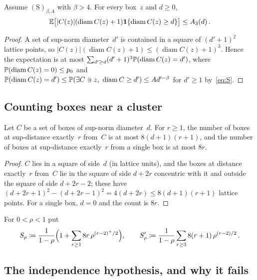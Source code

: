\documentclass[11pt,letterpaper]{article}
\DeclareMathOperator{\diam}{diam}
\begin{document}
\begin{lemma}
\label{lem:onecluster}
Assume $\mathrm{(S)}_{\beta,A}$ with $\beta>4$. For every box~$z$ and $d\ge0$,
\begin{equation*}
  \E\bigl[\lvert C(z)\rvert(\diam C(z)+1)\1\{\diam C(z)\ge d\}\bigr]\le A_3(d)\,.
\end{equation*}
\end{lemma}

\begin{proof}
A set of sup-norm diameter~$d'$ is contained in a square of $(d'+1)^2$ lattice points, so $\lvert C(z)\rvert(\diam C(z)+1)\le(\diam C(z)+1)^3$. Hence the expectation is at most $\sum_{d'\ge d}(d'+1)^3\P(\diam C(z)=d')$, where $\P(\diam C(z)=0)\le p_0$ and $\P(\diam C(z)=d')\le\P(\exists C\ni z,\ \diam C\ge d')\le Ad'^{-\beta}$ for $d'\ge1$ by~\eqref{eq:S}.
\end{proof}

\subsection{Counting boxes near a cluster}

\begin{lemma}
\label{lem:counts}
Let $C$ be a set of boxes of sup-norm diameter~$d$. For $r\ge1$, the number of boxes at sup-distance exactly~$r$ from~$C$ is at most $8(d+1)(r+1)$, and the number of boxes at sup-distance exactly~$r$ from a single box is at most $8r$.
\end{lemma}

\begin{proof}
$C$ lies in a square of side~$d$ (in lattice units), and the boxes at distance exactly~$r$ from~$C$ lie in the square of side $d+2r$ concentric with it and outside the square of side $d+2r-2$; these have $(d+2r+1)^2-(d+2r-1)^2=4(d+2r)\le8(d+1)(r+1)$ lattice points. For a single box, $d=0$ and the count is $8r$.
\end{proof}

For $0<\rho<1$ put
\begin{equation}
\label{eq:Srho}
  S_\rho\coloneqq\frac1{1-\rho}\Bigl(1+\sum_{r\ge1}8r\,\rho^{(r-2)^+/2}\Bigr),\qquad
  S'_\rho\coloneqq\frac1{1-\rho}\sum_{r\ge3}8(r+1)\,\rho^{(r-2)/2}\,.
\end{equation}

\subsection{The independence hypothesis, and why it fails}
\label{sec:dep}
\end{document}
